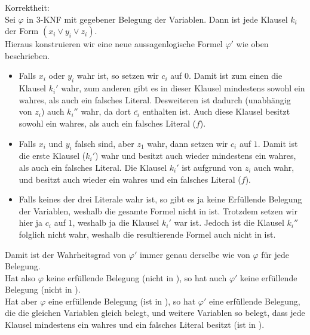 \documentclass[a4paper,11pt]{scrartcl}
\renewcommand{\phi}{\varphi}
\begin{document}
	Korrektheit:\\
		Sei $\phi$ in 3-KNF mit gegebener Belegung der Variablen. Dann ist jede Klausel $k_i$ der Form $(x_i \lor y_i \lor z_i)$.\\
		Hieraus konstruieren wir eine neue aussagenlogische Formel $\phi '$ wie oben beschrieben.\\
		\begin{itemize}
		\item Falls $x_i$ oder $y_i$ wahr ist, so setzen wir $c_i$ auf $0$. Damit ist zum einen die Klausel $k_i'$ wahr, zum anderen gibt es in dieser Klausel mindestens sowohl ein wahres, als auch ein falsches Literal. Desweiteren ist dadurch (unabhängig von $z_i$) auch $k_i''$ wahr, da dort $\bar{c_i}$ enthalten ist. Auch diese Klausel besitzt sowohl ein wahres, als auch ein falsches Literal ($f$).
		
		\item Falls $x_i$ und $y_i$ falsch sind, aber $z_1$ wahr, dann setzen wir $c_i$ auf $1$. Damit ist die erste Klausel ($k_i'$) wahr und besitzt auch wieder mindestens ein wahres, als auch ein falsches Literal. Die Klausel $k_i'$ ist aufgrund von $z_i$ auch wahr, und besitzt auch wieder ein wahres und ein falsches Literal ($f$).
		
		\item Falls keines der drei Literale wahr ist, so gibt es ja keine Erfüllende Belegung der Variablen, weshalb die gesamte Formel nicht in  ist. Trotzdem setzen wir hier ja $c_i$ auf $1$, weshalb ja die Klausel $k_i'$ war ist. Jedoch ist die Klausel $k_i''$ folglich nicht wahr, weshalb die resultierende Formel auch nicht in  ist.
		\end{itemize}
		Damit ist der Wahrheitsgrad von $\phi '$ immer genau derselbe wie von $\phi$ für jede Belegung.\\
		Hat also $\phi$ keine erfüllende Belegung (nicht in ), so hat auch $\phi '$ keine erfüllende Belegung (nicht in ).\\
		Hat aber $\phi$ eine erfüllende Belegung (ist in ), so hat $\phi '$ eine erfüllende Belegung, die die gleichen Variablen gleich belegt, und weitere Variablen so belegt, dass jede Klausel mindestens ein wahres und ein falsches Literal besitzt (ist in ).
	
\end{document}

